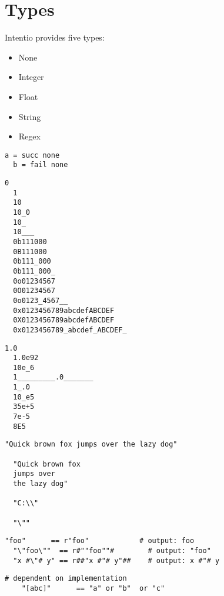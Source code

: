 \chapter{Types}

Intentio provides five types:
\begin{itemize}
  \item None
  \item Integer
  \item Float
  \item String
  \item Regex
\end{itemize}

\begin{example}[None]
\begin{lstlisting}[language=intentio]
  a = succ none
  b = fail none
\end{lstlisting}
\end{example}

\begin{example}[Integer]
\begin{lstlisting}[language=intentio]
  0
  1
  10
  10_0
  10_
  10___
  0b111000
  0B111000
  0b111_000
  0b111_000_
  0o01234567
  0O01234567
  0o0123_4567__
  0x0123456789abcdefABCDEF
  0X0123456789abcdefABCDEF
  0x0123456789_abcdef_ABCDEF_
\end{lstlisting}
\end{example}

\begin{example}[Float]
\begin{lstlisting}[language=intentio]
  1.0
  1.0e92
  10e_6
  1_________.0_______
  1_.0
  10_e5
  35e+5
  7e-5
  8E5
\end{lstlisting}
\end{example}

\begin{example}[String]
\begin{lstlisting}[language=intentio,mathescape=true]
  "Quick brown fox jumps over the lazy dog"

  "Quick brown fox
  jumps over
  the lazy dog"

  "C:\\"

  "\""
\end{lstlisting}
\end{example}

\begin{example}
\begin{lstlisting}[language=intentio]
  "foo"      == r"foo"            # output: foo
  "\"foo\""  == r#""foo""#        # output: "foo"
  "x #\"# y" == r##"x #"# y"##    # output: x #"# y
\end{lstlisting}
\end{example}

\begin{example}[Regex]
  \begin{lstlisting}[language=intentio]
    # dependent on implementation 
    "[abc]"      == "a" or "b"  or "c"
  \end{lstlisting}
  \end{example}
